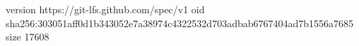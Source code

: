 version https://git-lfs.github.com/spec/v1
oid sha256:303051aff0d1b343052e7a38974c4322532d703adbab6767404ad7b1556a7685
size 17608
